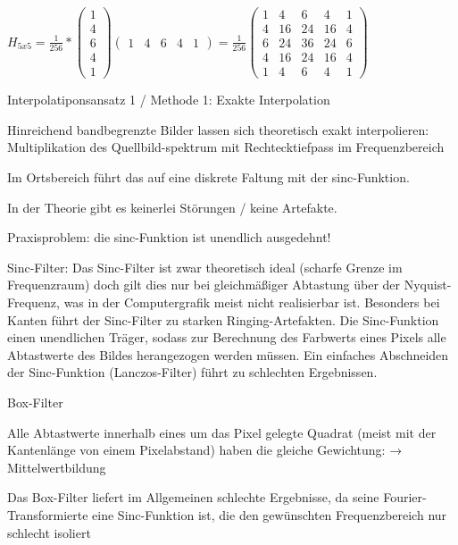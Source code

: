 \documentclass[landscape]{article}
\begin{document}
\begin{multicols}{3}
  $H_{5x5} =\frac{1}{256} * \begin{pmatrix} 1\\4\\6\\4\\1 \end{pmatrix} \begin{pmatrix} 1&4&6&4&1 \end{pmatrix}=\frac{1}{256} \begin{pmatrix} 1&4&6&4&1\\ 4&16&24&16&4\\ 6&24&36&24&6\\ 4&16&24&16&4\\ 1&4&6&4&1 \end{pmatrix}$
  
  Interpolatiponsansatz 1 / Methode 1: Exakte Interpolation
  \begin{itemize*}
    \item Hinreichend bandbegrenzte Bilder lassen sich theoretisch exakt interpolieren: Multiplikation des Quellbild-spektrum mit Rechtecktiefpass im Frequenzbereich
    \item Im Ortsbereich führt das auf eine diskrete Faltung mit der sinc-Funktion.
    \item In der Theorie gibt es keinerlei Störungen / keine Artefakte.
    \item Praxisproblem: die sinc-Funktion ist unendlich ausgedehnt!
  \end{itemize*}
  
  Sinc-Filter: Das Sinc-Filter ist zwar theoretisch ideal (scharfe Grenze im Frequenzraum) doch gilt dies nur bei gleichmäßiger Abtastung über der Nyquist-Frequenz, was in der Computergrafik meist nicht realisierbar ist. Besonders bei Kanten führt der Sinc-Filter zu starken Ringing-Artefakten. 
  Die Sinc-Funktion einen unendlichen Träger, sodass zur Berechnung des Farbwerts eines Pixels alle Abtastwerte des Bildes herangezogen werden müssen. Ein einfaches Abschneiden der Sinc-Funktion (Lanczos-Filter) führt zu schlechten Ergebnissen.
  
  \begin{itemize*}
    \item Box-Filter
          \begin{itemize*}
            \item Alle Abtastwerte innerhalb eines um das Pixel gelegte Quadrat (meist mit der Kantenlänge von einem Pixelabstand) haben die gleiche Gewichtung: → Mittelwertbildung
            \item Das Box-Filter liefert im Allgemeinen schlechte Ergebnisse, da seine Fourier-Transformierte eine Sinc-Funktion ist, die den gewünschten Frequenzbereich nur schlecht isoliert
          \end{itemize*}
          

\end{itemize*}
\end{multicols}
\end{document}
